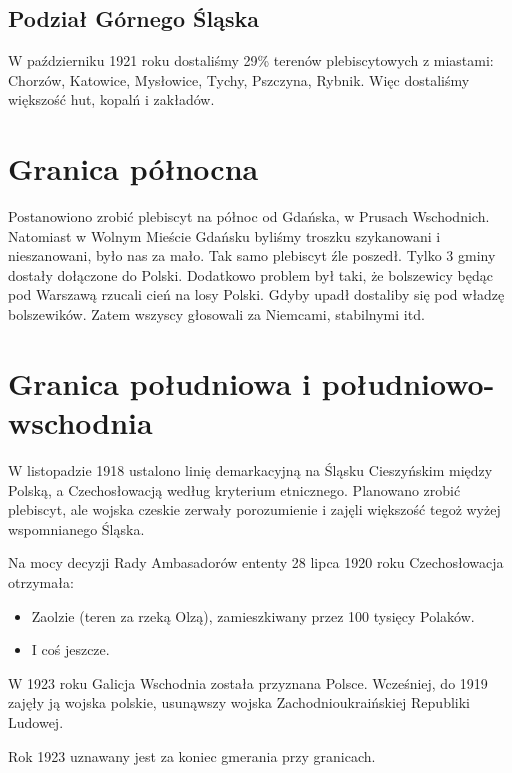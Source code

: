 \documentclass [a4paper, 11pt, oneside]{book}
\begin{document}
        \subsection{Podział Górnego Śląska} %
        \label{sub:podzia_g_rnego_l_ska}
            W październiku 1921 roku dostaliśmy 29\% terenów plebiscytowych z miastami: Chorzów, Katowice, Mysłowice, Tychy, Pszczyna, Rybnik. Więc dostaliśmy większość hut, kopalń i zakładów.
    \section{Granica północna} %
    \label{sec:granica_p_nocna}
        Postanowiono zrobić plebiscyt na północ od Gdańska, w Prusach Wschodnich. Natomiast w Wolnym Mieście Gdańsku byliśmy troszku szykanowani i nieszanowani, było nas za mało. Tak samo plebiscyt źle poszedł. Tylko 3 gminy dostały dołączone do Polski. Dodatkowo problem był taki, że bolszewicy będąc pod Warszawą rzucali cień na losy Polski. Gdyby upadł dostaliby się pod władzę bolszewików. Zatem wszyscy głosowali za Niemcami, stabilnymi itd.
    \section{Granica południowa i południowo-wschodnia} %
    \label{sec:granica_po_udniowa_i_po_udniowo_wschodnia}
        W listopadzie 1918 ustalono linię demarkacyjną na Śląsku Cieszyńskim między Polską, a Czechosłowacją według kryterium etnicznego. Planowano zrobić plebiscyt, ale wojska czeskie zerwały porozumienie i zajęli większość tegoż wyżej wspomnianego Śląska.

        Na mocy decyzji Rady Ambasadorów ententy 28 lipca 1920 roku Czechosłowacja otrzymała:
        \begin{itemize}
            \item Zaolzie (teren za rzeką Olzą), zamieszkiwany przez 100 tysięcy Polaków.
            \item I coś jeszcze.
        \end{itemize}

        W 1923 roku Galicja Wschodnia została przyznana Polsce. Wcześniej, do 1919 zajęły ją wojska polskie, usunąwszy wojska Zachodnioukraińskiej Republiki Ludowej.

        Rok 1923 uznawany jest za koniec gmerania przy granicach.
\end{document}
